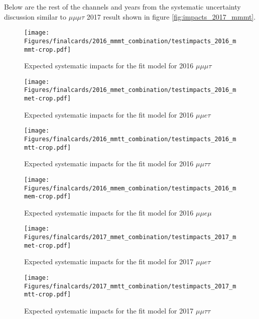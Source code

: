 

Below are the rest of the channels and years from the systematic uncertainty discussion similar to $\mu\mu\mu\tau$ 2017 result shown in figure \ref{fig:impacts_2017_mmmt}. 

\begin{figure}[ht!b]
    \centering 
\texttt{[image: Figures/finalcards/2016\_mmmt\_combination/testimpacts\_2016\_mmmt-crop.pdf]}
    \caption{\label{fig:impacts_2016_mmmt} Expected systematic impacts for the fit model for 2016 $\mu\mu\mu\tau$}
\end{figure}

\begin{figure}[ht!b]
    \centering 
\texttt{[image: Figures/finalcards/2016\_mmet\_combination/testimpacts\_2016\_mmet-crop.pdf]}
    \caption{\label{fig:impacts_2016_mmet} Expected systematic impacts for the fit model for 2016 $\mu\mu e \tau$}
\end{figure}

\begin{figure}[ht!b]
    \centering 
\texttt{[image: Figures/finalcards/2016\_mmtt\_combination/testimpacts\_2016\_mmtt-crop.pdf]}
    \caption{\label{fig:impacts_2016_mmtt} Expected systematic impacts for the fit model for 2016 $\mu\mu\tau\tau$}
\end{figure}

\begin{figure}[ht!b]
    \centering 
\texttt{[image: Figures/finalcards/2016\_mmem\_combination/testimpacts\_2016\_mmem-crop.pdf]}
    \caption{\label{fig:impacts_2016_mmem} Expected systematic impacts for the fit model for 2016 $\mu\mu e \mu$}
\end{figure}


\begin{figure}[ht!b]
    \centering 
\texttt{[image: Figures/finalcards/2017\_mmet\_combination/testimpacts\_2017\_mmet-crop.pdf]}
    \caption{\label{fig:impacts_2017_mmet} Expected systematic impacts for the fit model for 2017 $\mu\mu e \tau$}
\end{figure}

\begin{figure}[ht!b]
    \centering 
\texttt{[image: Figures/finalcards/2017\_mmtt\_combination/testimpacts\_2017\_mmtt-crop.pdf]}
    \caption{\label{fig:impacts_2017_mmtt} Expected systematic impacts for the fit model for 2017 $\mu\mu\tau\tau$}
\end{figure}

